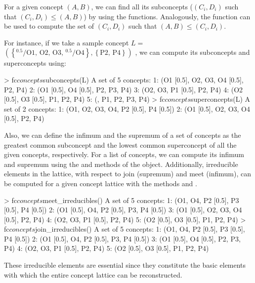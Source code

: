 For a given concept \((A, B)\), we can find all its subconcepts
(\((C_i, D_i)\) such that \((C_i, D_i)\le (A, B)\)) by using the
 functions. Analogously, the 
function can be used to compute the set of \((C_i, D_i)\) such that
\((A, B) \le (C_i, D_i)\).

For instance, if we take a sample concept \(L=\)
\ensuremath{\left(\ensuremath{\left\{{^{0.5}}\!/\mathrm{O1},\, \mathrm{O2},\, \mathrm{O3},\, {^{0.5}}\!/\mathrm{O4}\right\}}, \ensuremath{\left\{\mathrm{P2},\, \mathrm{P4}\right\}}\right)}
, we can compute its subconcepts and superconcepts using:

\begin{example}
> fc$concepts$subconcepts(L)
A set of 5 concepts:
1: ({O1 [0.5], O2, O3, O4 [0.5]}, {P2, P4})
2: ({O1 [0.5], O4 [0.5]}, {P2, P3, P4})
3: ({O2, O3}, {P1 [0.5], P2, P4})
4: ({O2 [0.5], O3 [0.5]}, {P1, P2, P4})
5: ({}, {P1, P2, P3, P4})
> fc$concepts$superconcepts(L)
A set of 2 concepts:
1: ({O1, O2, O3, O4}, {P2 [0.5], P4 [0.5]})
2: ({O1 [0.5], O2, O3, O4 [0.5]}, {P2, P4})
\end{example}

Also, we can define the infimum and the supremum of a set of concepts as
the greatest common subconcept and the lowest common superconcept of all
the given concepts, respectively. For a list of concepts, we can compute
its infimum and supremum using the  and
 methods of the  object. Additionally, irreducible elements in the lattice, with respect to join
(supremum) and meet (infimum), can be computed for a given concept
lattice with the methods  and
.

\begin{example}
> fc$concepts$meet_irreducibles()
A set of 5 concepts:
1: ({O1, O4}, {P2 [0.5], P3 [0.5], P4 [0.5]})
2: ({O1 [0.5], O4}, {P2 [0.5], P3, P4 [0.5]})
3: ({O1 [0.5], O2, O3, O4 [0.5]}, {P2, P4})
4: ({O2, O3}, {P1 [0.5], P2, P4})
5: ({O2 [0.5], O3 [0.5]}, {P1, P2, P4})
> fc$concepts$join_irreducibles()
A set of 5 concepts:
1: ({O1, O4}, {P2 [0.5], P3 [0.5], P4 [0.5]})
2: ({O1 [0.5], O4}, {P2 [0.5], P3, P4 [0.5]})
3: ({O1 [0.5], O4 [0.5]}, {P2, P3, P4})
4: ({O2, O3}, {P1 [0.5], P2, P4})
5: ({O2 [0.5], O3 [0.5]}, {P1, P2, P4})
\end{example}

These irreducible elements are essential since they constitute the basic
elements with which the entire concept lattice can be reconstructed.

